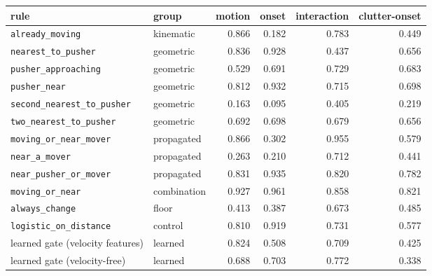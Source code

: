 \begin{tabular}{llrrrr}
\toprule
rule & group & motion & onset & interaction & clutter-onset \\
\midrule
\texttt{already\_moving} & kinematic & 0.866 & 0.182 & 0.783 & 0.449 \\
\midrule
\texttt{nearest\_to\_pusher} & geometric & 0.836 & 0.928 & 0.437 & 0.656 \\
\texttt{pusher\_approaching} & geometric & 0.529 & 0.691 & 0.729 & 0.683 \\
\texttt{pusher\_near} & geometric & 0.812 & 0.932 & 0.715 & 0.698 \\
\texttt{second\_nearest\_to\_pusher} & geometric & 0.163 & 0.095 & 0.405 & 0.219 \\
\texttt{two\_nearest\_to\_pusher} & geometric & 0.692 & 0.698 & 0.679 & 0.656 \\
\midrule
\texttt{moving\_or\_near\_mover} & propagated & 0.866 & 0.302 & 0.955 & 0.579 \\
\texttt{near\_a\_mover} & propagated & 0.263 & 0.210 & 0.712 & 0.441 \\
\texttt{near\_pusher\_or\_mover} & propagated & 0.831 & 0.935 & 0.820 & 0.782 \\
\midrule
\texttt{moving\_or\_near} & combination & 0.927 & 0.961 & 0.858 & 0.821 \\
\midrule
\texttt{always\_change} & floor & 0.413 & 0.387 & 0.673 & 0.485 \\
\midrule
\texttt{logistic\_on\_distance} & control & 0.810 & 0.919 & 0.731 & 0.577 \\
\midrule
learned gate (velocity features) & learned & 0.824 & 0.508 & 0.709 & 0.425 \\
learned gate (velocity-free) & learned & 0.688 & 0.703 & 0.772 & 0.338 \\
\bottomrule
\end{tabular}
